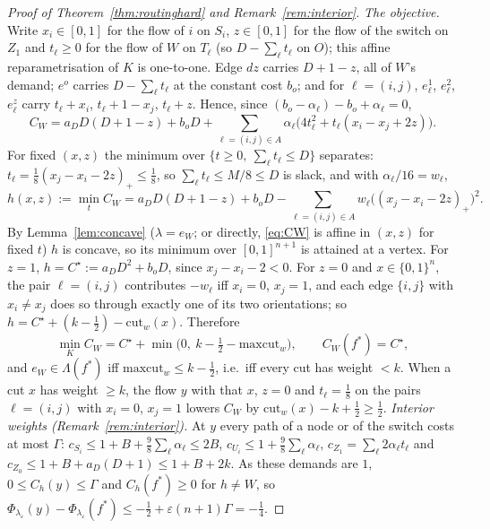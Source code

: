 \documentclass[11pt,a4paper]{article}
\theoremstyle{plain}
\theoremstyle{definition}
\theoremstyle{remark}
\newcommand{\Lam}{\Lambda}
\begin{document}
\begin{proof}[Proof of Theorem~\ref{thm:routinghard} and Remark~\ref{rem:interior}]
\emph{The objective.} Write $x_i\in[0,1]$ for the flow of $i$ on $S_i$, $z\in[0,1]$ for the flow of the switch on $Z_1$ and $t_\ell\ge0$ for the flow of $W$ on $T_\ell$ (so $D-\sum_\ell t_\ell$ on $O$); this affine reparametrisation of $K$ is one-to-one. Edge $dz$ carries $D+1-z$, all of $W$'s demand; $e^o$ carries $D-\sum_\ell t_\ell$ at the constant cost $b_o$; and for $\ell=(i,j)$, $e^1_\ell$, $e^2_\ell$, $e^z_\ell$ carry $t_\ell+x_i$, $t_\ell+1-x_j$, $t_\ell+z$. Hence, since $(b_o-\alpha_\ell)-b_o+\alpha_\ell=0$,
\begin{equation}\label{eq:CW}
C_W=a_DD(D+1-z)+b_oD+\sum_{\ell=(i,j)\in A}\alpha_\ell\big(4t_\ell^2+t_\ell(x_i-x_j+2z)\big).
\end{equation}
For fixed $(x,z)$ the minimum over $\{t\ge0,\ \sum_\ell t_\ell\le D\}$ separates: $t_\ell=\tfrac18(x_j-x_i-2z)_+\le\tfrac18$, so $\sum_\ell t_\ell\le M/8\le D$ is slack, and with $\alpha_\ell/16=w_\ell$,
\[
h(x,z):=\min_tC_W=a_DD(D+1-z)+b_oD-\sum_{\ell=(i,j)\in A}w_\ell\big((x_j-x_i-2z)_+\big)^2 .
\]
By Lemma~\ref{lem:concave} ($\lambda=e_W$; or directly, \eqref{eq:CW} is affine in $(x,z)$ for fixed $t$) $h$ is concave, so its minimum over $[0,1]^{n+1}$ is attained at a vertex. For $z=1$, $h=C^\star:=a_DD^2+b_oD$, since $x_j-x_i-2<0$. For $z=0$ and $x\in\{0,1\}^n$, the pair $\ell=(i,j)$ contributes $-w_\ell$ iff $x_i=0$, $x_j=1$, and each edge $\{i,j\}$ with $x_i\ne x_j$ does so through exactly one of its two orientations; so $h=C^\star+(k-\tfrac12)-\mathrm{cut}_w(x)$. Therefore
\[
\min_KC_W=C^\star+\min\big(0,\ k-\tfrac12-\mathrm{maxcut}_w\big),\qquad C_W(f^*)=C^\star,
\]
and $e_W\in\Lam(f^*)$ iff $\mathrm{maxcut}_w\le k-\tfrac12$, i.e.\ iff every cut has weight $<k$. When a cut $x$ has weight $\ge k$, the flow $y$ with that $x$, $z=0$ and $t_\ell=\tfrac18$ on the pairs $\ell=(i,j)$ with $x_i=0$, $x_j=1$ lowers $C_W$ by $\mathrm{cut}_w(x)-k+\tfrac12\ge\tfrac12$. \emph{Interior weights (Remark~\ref{rem:interior}).} At $y$ every path of a node or of the switch costs at most $\Gamma$: $c_{S_i}\le1+B+\tfrac98\sum_\ell\alpha_\ell\le2B$, $c_{U_i}\le1+\tfrac98\sum_\ell\alpha_\ell$, $c_{Z_1}=\sum_\ell2\alpha_\ell t_\ell$ and $c_{Z_0}\le1+B+a_D(D+1)\le1+B+2k$. As these demands are $1$, $0\le C_h(y)\le\Gamma$ and $C_h(f^*)\ge0$ for $h\ne W$, so $\Phi_{\lambda_\varepsilon}(y)-\Phi_{\lambda_\varepsilon}(f^*)\le-\tfrac12+\varepsilon(n+1)\Gamma=-\tfrac14$.


\end{proof}
\end{document}
